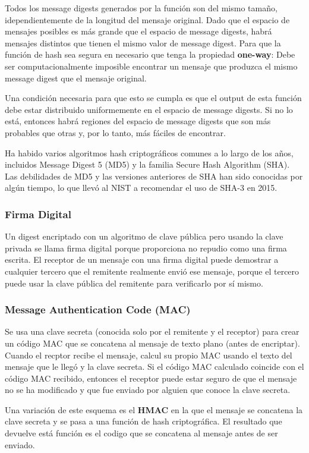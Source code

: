 Todos los message digests generados por la función son del mismo tamaño, idependientemente de la longitud del mensaje original. Dado que el espacio de mensajes posibles es más grande que el espacio de message digests, habrá mensajes distintos que tienen el mismo valor de message digest. Para que la función de hash sea segura en necesario que tenga la propiedad \textbf{one-way}: Debe ser computacionalmente imposible encontrar un mensaje que produzca el mismo message digest que el mensaje original. 

Una condición necesaria para que esto se cumpla es que el output de esta función debe estar distribuido uniformemente en el espacio de message digests. Si no lo está, entonces habrá regiones del espacio de message digests que son más probables que otras y, por lo tanto, más fáciles de encontrar.

Ha habido varios algoritmos hash criptográficos comunes a lo largo de los años, incluidos Message Digest 5 (MD5) y la familia Secure Hash Algorithm (SHA). Las debilidades de MD5 y las versiones anteriores de SHA han sido conocidas por algún tiempo, lo que llevó al NIST a recomendar el uso de SHA-3 en 2015.

\subsubsection{Firma Digital} Un digest encriptado con un algoritmo de clave pública pero usando la clave privada se llama firma digital porque proporciona no repudio como una firma escrita. El receptor de un mensaje con una firma digital puede demostrar a cualquier tercero que el remitente realmente envió ese mensaje, porque el tercero puede usar la clave pública del remitente para verificarlo por sí mismo.

\subsubsection{Message Authentication Code (MAC)} 
Se usa una clave secreta (conocida solo por el remitente y el receptor) para crear un código MAC que se concatena al mensaje de texto plano (antes de encriptar). Cuando el recptor recibe  el mensaje, calcul su propio MAC usando el texto del mensaje que le llegó y la clave secreta. Si el código MAC calculado coincide con el código MAC recibido, entonces el receptor puede estar seguro de que el mensaje no se ha modificado y que fue enviado por alguien que conoce la clave secreta. 

Una variación de este esquema es el \textbf{HMAC} en la que el mensaje se concatena la clave secreta y se pasa a una función de hash criptográfica. El resultado que devuelve está función es el codigo que se concatena al mensaje antes de ser enviado.

